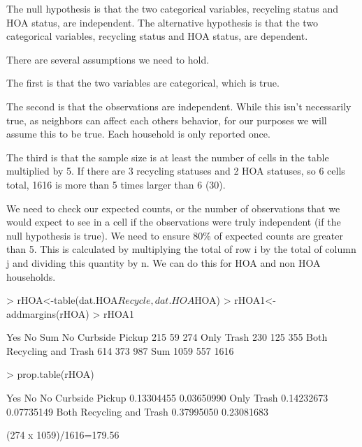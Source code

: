 \documentclass{article}
\begin{document}
The null hypothesis is that the two categorical variables, recycling status and HOA status, are independent.
The alternative hypothesis is that the two categorical variables, recycling status and HOA status, are dependent. 

There are several assumptions we need to hold. 

The first is that the two variables are categorical, which is true.

The second is that the observations are independent. While this isn't necessarily true, as neighbors can affect each others behavior, for our purposes we will assume this to be true. Each household is only reported once. 

The third is that the sample size is at least the number of cells in the table multiplied by 5. If there are 3 recycling statuses and 2 HOA statuses, so 6 cells total, 1616 is more than 5 times larger than 6 (30). 

We need to check our expected counts, or the number of observations that we would expect to see in a cell if the observations were truly independent (if the null hypothesis is true). We need to ensure 80\% of expected counts are greater than 5. This is calculated by multiplying the total of row i by the total of column j and dividing this quantity by n. We can do this for HOA and non HOA households. 

\begin{Schunk}
\begin{Sinput}
> rHOA<-table(dat.HOA$Recycle,dat.HOA$HOA)
> rHOA1<-addmargins(rHOA)
> rHOA1
\end{Sinput}
\begin{Soutput}
                            Yes   No  Sum
  No Curbside Pickup        215   59  274
  Only Trash                230  125  355
  Both Recycling and Trash  614  373  987
  Sum                      1059  557 1616
\end{Soutput}
\begin{Sinput}
> prop.table(rHOA)
\end{Sinput}
\begin{Soutput}
                                  Yes         No
  No Curbside Pickup       0.13304455 0.03650990
  Only Trash               0.14232673 0.07735149
  Both Recycling and Trash 0.37995050 0.23081683
\end{Soutput}
\end{Schunk}
(274 x 1059)/1616=179.56
\end{document}
